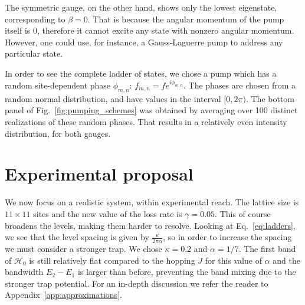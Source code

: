 \documentclass[twocolumn, 10pt, aps, superscriptaddress, floatfix, showpacs, pra, citeautoscript]{revtex4-1}
\newcommand{\co}[2]{#2}
\renewcommand{\paragraph}{\co}
\begin{document}
The symmetric gauge, on the other hand, shows only the lowest
eigenstate, corresponding to $\beta=0$. That is because the angular
momentum of the pump itself is 0, therefore it cannot excite any state
with nonzero angular momentum. However, one could use, for instance, a
Gauss-Laguerre pump to address any particular state.

\paragraph{One must use a random phase in order to see all the states.}
In order to see the complete ladder of states, we chose a pump which
has a random site-dependent phase $\phi_{m,n}$:
$f_{m,n}=fe^{i\phi_{m,n}}$.  The phases are chosen from a random
normal distribution, and have values in the interval $[0,2\pi)$. The
bottom panel of Fig.~\ref{fig:pumping_schemes} was obtained by
averaging over 100 distinct realizations of these random phases. That
results in a relatively even intensity distribution, for both gauges.


\section{Experimental proposal}
\label{sec:experiment}

\paragraph{Greater dissipation implies spectral broadening.}
We now focus on a realistic system, within experimental reach. The
lattice size is $11 \times 11$ sites and the new value of the loss
rate is $\gamma = 0.05$. This of course broadens the levels, making
them harder to resolve. Looking at Eq.~\eqref{eq:ladders}, we see that
the level spacing is given by $\frac{\kappa}{2\pi\alpha}$, so in order
to increase the spacing we must consider a stronger trap. We chose
$\kappa = 0.2$ and $\alpha = 1/7$. The first band of $\mathcal{H}_0$
is still relatively flat compared to the hopping $J$ for this value of
$\alpha$ and the bandwidth $E_2 - E_1$ is larger than before,
preventing the band mixing due to the stronger trap potential. For an
in-depth discussion we refer the reader to
Appendix~\ref{app:approximations}.
\end{document}
